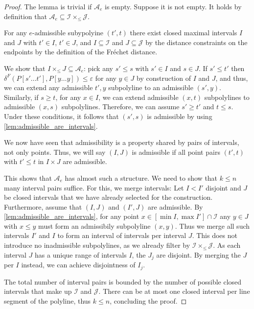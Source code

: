 \begin{proof}
	The lemma is trivial if \(\mathcal{A}_e\) is empty. Suppose it is not empty. It holds by definition that \(\mathcal{A}_e \subseteq \mathcal{I} \times_\leq \mathcal{J}\). 

	For any \(e\)-admissible subypolyine \((t', t)\) there exist closed maximal intervals \(I\) and \(J\) with \(t' \in I\), \(t' \in J\), and \(I \subseteq \mathcal{I}\) and \(J \subseteq \mathcal{J}\) by the distance constraints on the endpoints by the definition of the Fréchet distance. 

	We show that \(I \times_\leq J \subseteq \mathcal{A}_e\): pick any \(s' \leq s\) with \(s' \in I\) and \(s \in J\). If \(s' \leq t'\) then \(\delta^F(P[s' \dots t'], P[y \dots y]) \leq \varepsilon\) for any \(y \in J\) by construction of \(I\) and \(J\), and thus, we can extend any admissible \(t', y\) subpolyline to an admissible \((s', y)\). Similarly, if \(s \geq t\), for any \(x \in I\), we can extend admissible \((x, t)\) subpolylines to admissible \((x, s)\) subpolylines. Therefore, we can assume \(s' \geq t'\) and \(t \leq s\). Under these conditions, it follows that \((s', s)\) is admissible by using \cref{lem:admissible_are_intervals}.

	We now have seen that admissibility is a property shared by pairs of intervals, not only points. Thus, we will say \((I, J)\) is admissible if all point pairs \((t', t)\) with \(t' \leq t\) in \(I \times J\) are admissible.


	This shows that \(\mathcal{A}_e\) has almost such a structure. We need to show that \(k \leq n\) many interval pairs suffice. For this, we merge intervals: Let \(I < I'\) disjoint and \(J\) be closed intervals that we have already selected for the construction. Furthermore, assume that \((I, J)\) and \((I', J)\) are admissible. By \cref{lem:admissible_are_intervals}, for any point \(x \in [\min I, \max I'] \cap \mathcal{I}\) any \(y \in J\) with \(x \leq y\) must form an admissibily subpolyline \((x, y)\). Thus we merge all such intervals \(I'\) and \(I\) to form an interval of intervals per interval \(J\). This does not introduce no inadmissible subpolylines, as we already filter by \(\mathcal{I} \times_\leq \mathcal{J}\). As each interval \(J\) has a unique range of intervals \(I\), the \(J_j\) are disjoint. By merging the \(J\) per \(I\) instead, we can achieve disjointness of \(I_j\).

	The total number of interval pairs is bounded by the number of possible closed intervals that make up \(\mathcal{I}\) and \(\mathcal{J}\). There can be at most one closed interval per line segment of the polyline, thus \(k \leq n\), concluding the proof.
\end{proof}


